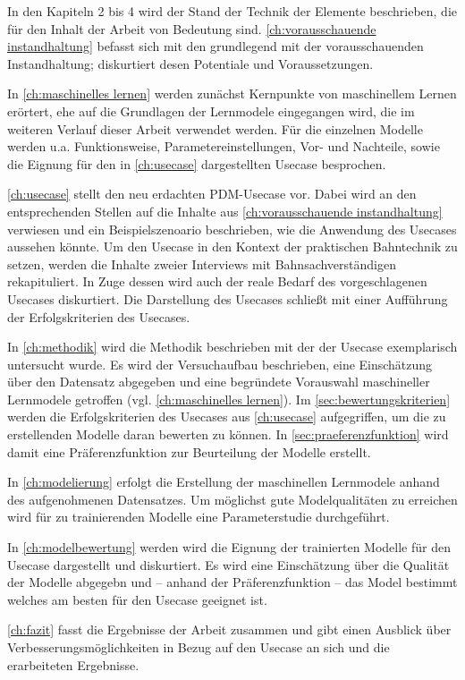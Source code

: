 In den Kapiteln 2 bis 4 wird der Stand der Technik der Elemente beschrieben, die für den Inhalt der Arbeit von Bedeutung sind. \cref{ch:vorausschauende instandhaltung} befasst sich mit den grundlegend mit der vorausschauenden Instandhaltung; diskurtiert desen Potentiale und Voraussetzungen.

In \cref{ch:maschinelles lernen} werden zunächst Kernpunkte von maschinellem Lernen erörtert, ehe auf die Grundlagen der Lernmodele eingegangen wird, die im weiteren Verlauf dieser Arbeit verwendet werden. Für die einzelnen Modelle werden u.a. Funktionsweise, Parametereinstellungen, Vor- und Nachteile, sowie die Eignung für den in \cref{ch:usecase} dargestellten Usecase besprochen.

\cref{ch:usecase} stellt den neu erdachten PDM-Usecase vor. Dabei wird an den entsprechenden Stellen auf die Inhalte aus \cref{ch:vorausschauende instandhaltung} verwiesen und ein Beispielszenoario beschrieben, wie die Anwendung des Usecases aussehen könnte. Um den Usecase in den Kontext der praktischen Bahntechnik zu setzen, werden die Inhalte zweier Interviews mit Bahnsachverständigen rekapituliert. In Zuge dessen wird auch der reale Bedarf des vorgeschlagenen Usecases diskurtiert. Die Darstellung des Usecases schließt mit einer Aufführung der Erfolgskriterien des Usecases.

In \cref{ch:methodik} wird die Methodik beschrieben mit der der Usecase exemplarisch untersucht wurde. Es wird der Versuchaufbau beschrieben, eine Einschätzung über den Datensatz abgegeben und eine begründete Vorauswahl maschineller Lernmodele getroffen (vgl. \cref{ch:maschinelles lernen}). Im \cref{sec:bewertungskriterien} werden die Erfolgskriterien des Usecases aus \cref{ch:usecase} aufgegriffen, um die zu erstellenden Modelle daran bewerten zu können. In \cref{sec:praeferenzfunktion} wird damit eine Präferenzfunktion zur Beurteilung der Modelle erstellt.

In \cref{ch:modelierung} erfolgt die Erstellung der maschinellen Lernmodele anhand des aufgenohmenen Datensatzes. Um möglichst gute Modelqualitäten zu erreichen wird für zu trainierenden Modelle eine Parameterstudie durchgeführt.

In \cref{ch:modelbewertung} werden wird die Eignung der trainierten Modelle für den Usecase dargestellt und diskurtiert. Es wird eine Einschätzung über die Qualität der Modelle abgegebn und -- anhand der Präferenzfunktion -- das Model bestimmt welches am besten für den Usecase geeignet ist.

\cref{ch:fazit} fasst die Ergebnisse der Arbeit zusammen und gibt einen Ausblick über Verbesserungsmöglichkeiten in Bezug auf den Usecase an sich und die erarbeiteten Ergebnisse.